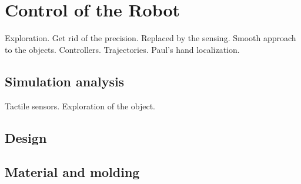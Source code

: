 \section{Control of the Robot}
\label{sec:constrol}
Exploration. Get rid of the precision. Replaced by the sensing.
Smooth approach to the objects. Controllers. Trajectories. Paul's
hand localization.


\subsection{Simulation analysis}
\label{sec:analysis}

Tactile sensors. Exploration of the object.


\subsection{Design}

\subsection{Material and molding}

